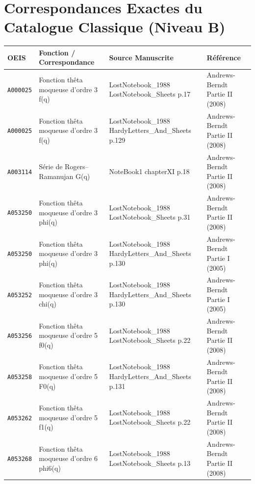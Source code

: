 \documentclass[11pt,twoside,openright]{book}
\begin{document}
\chapter{Correspondances Exactes du Catalogue Classique (Niveau B)}
\begin{longtable}{p{2.0cm}p{4.5cm}p{3.8cm}p{3.5cm}}
\toprule
\textbf{OEIS} & \textbf{Fonction / Correspondance} & \textbf{Source Manuscrite} & \textbf{Référence} \\
\midrule
\endhead
\texttt{A000025} & Fonction thêta moqueuse d'ordre 3 f(q) & LostNotebook\_1988 LostNotebook\_Sheets p.17 & Andrews-Berndt Partie II (2008) \\
\texttt{A000025} & Fonction thêta moqueuse d'ordre 3 f(q) & LostNotebook\_1988 HardyLetters\_And\_Sheets p.129 & Andrews-Berndt Partie II (2008) \\
\texttt{A003114} & Série de Rogers--Ramanujan G(q) & NoteBook1 chapterXI p.18 & Andrews-Berndt Partie II (2008) \\
\texttt{A053250} & Fonction thêta moqueuse d'ordre 3 phi(q) & LostNotebook\_1988 LostNotebook\_Sheets p.31 & Andrews-Berndt Partie II (2008) \\
\texttt{A053250} & Fonction thêta moqueuse d'ordre 3 phi(q) & LostNotebook\_1988 HardyLetters\_And\_Sheets p.130 & Andrews-Berndt Partie I (2005) \\
\texttt{A053252} & Fonction thêta moqueuse d'ordre 3 chi(q) & LostNotebook\_1988 HardyLetters\_And\_Sheets p.130 & Andrews-Berndt Partie I (2005) \\
\texttt{A053256} & Fonction thêta moqueuse d'ordre 5 f0(q) & LostNotebook\_1988 LostNotebook\_Sheets p.22 & Andrews-Berndt Partie II (2008) \\
\texttt{A053258} & Fonction thêta moqueuse d'ordre 5 F0(q) & LostNotebook\_1988 HardyLetters\_And\_Sheets p.131 & Andrews-Berndt Partie II (2008) \\
\texttt{A053262} & Fonction thêta moqueuse d'ordre 5 f1(q) & LostNotebook\_1988 LostNotebook\_Sheets p.22 & Andrews-Berndt Partie II (2008) \\
\texttt{A053268} & Fonction thêta moqueuse d'ordre 6 phi6(q) & LostNotebook\_1988 LostNotebook\_Sheets p.13 & Andrews-Berndt Partie II (2008) \\
\bottomrule
\end{longtable}
\end{document}
